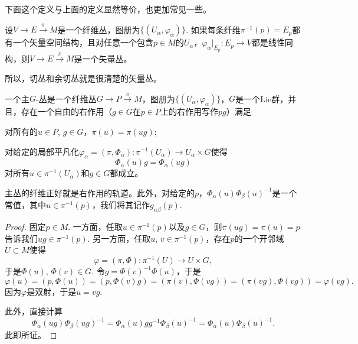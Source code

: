 下面这个定义与上面的定义显然等价，也更加常见一些。

\begin{pro}
设$V\to E\xrightarrow{\pi} M$是一个纤维丛，图册为$\{(U_\alpha,\varphi_\alpha)\}$. 如果每条纤维$\pi^{-1}(p)=E_p$都有一个矢量空间结构，且对任意一个包含$p\in M$的$U_\alpha$，$\varphi_{\alpha}|_{E_p}:E_p\to V$都是线性同构，则$V\to E\xrightarrow{\pi} M$是一个矢量丛。
\end{pro}

所以，切丛和余切丛就是很清楚的矢量丛。


\begin{para}[主$G$-丛]
一个主$G$-丛是一个纤维丛$G\to P\xrightarrow{\pi}M$，图册为$\{(U_\alpha,\varphi_\alpha)\}$，$G$是一个Lie群，并且，存在一个自由的右作用（$g\in G$在$p\in P$上的右作用写作$pg$）满足
\begin{compactenum}[~~~~(1)]
	\item 对所有的$u\in P$, $g\in G$，$\pi(u)=\pi(ug)$;
	\item 对给定的局部平凡化$\varphi_\alpha=(\pi,\Phi_\alpha):\pi^{-1}(U_\alpha)\to U_\alpha\times G$使得
	\[
	\Phi_\alpha(u)g=\Phi_\alpha(ug)
	\]
	对所有$u\in \pi^{-1}(U_\alpha)$和$g\in G$都成立。
\end{compactenum}
\end{para}

\begin{lem}
主丛的纤维正好就是右作用的轨道。此外，对给定的$p$，$\Phi_{\alpha}(u)\Phi_{\beta}(u)^{-1}$是一个常值，其中$u\in \pi^{-1}(p)$，我们将其记作$g_{\alpha\beta}(p)$.
\end{lem}

\begin{proof}
	固定$p\in M$. 一方面，任取$u\in\pi^{-1}(p)$以及$g\in G$，则$\pi(ug)=\pi(u)=p$告诉我们$ug\in \pi^{-1}(p)$. 
	另一方面，任取$u$, $v\in\pi^{-1}(p)$，存在$p$的一个开邻域$U\subset M$使得
	\[
	\varphi=(\pi,\Phi):\pi^{-1}(U)\to U\times G,
	\]
	于是$\Phi(u)$, $\Phi(v)\in G$. 令$g=\Phi(v)^{-1}\Phi(u)$，于是
	\[
	\varphi(u)=(p,\Phi(u))=(p,\Phi(v)g)=(\pi(v),\Phi(vg))=(\pi(vg),\Phi(vg))=\varphi(vg).
	\]
	因为$\varphi$是双射，于是$u=vg$.

	此外，直接计算
	\[
		\Phi_{\alpha}(ug)\Phi_{\beta}(ug)^{-1}=\Phi_{\alpha}(u)gg^{-1}\Phi_{\beta}(u)^{-1}=\Phi_{\alpha}(u)\Phi_{\beta}(u)^{-1}.
	\]
	此即所证。
\end{proof}

